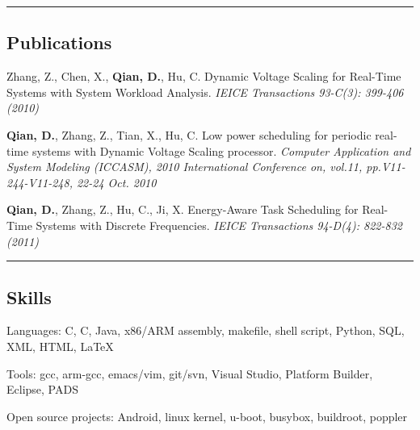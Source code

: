 \documentclass[10pt,letterpaper]{article}
\newenvironment{indentsection}[1]%
{\begin{list}{}%
	{\setlength{\leftmargin}{#1}}%
	\item[]%
}
{\end{list}}
\newcommand{\CPP}
{C\nolinebreak[4]\hspace{-.05em}\raisebox{.22ex}{\footnotesize\bf ++}}
\begin{document}
\hrule
\vspace{-0.4em}
\subsection*{Publications}

\begin{itemize*}
        \item
        Zhang, Z., Chen, X., \textbf{Qian, D.}, Hu, C. Dynamic Voltage Scaling for Real-Time Systems with System Workload Analysis. \emph{IEICE Transactions 93-C(3): 399-406 (2010)}
	\item
        \textbf{Qian, D.}, Zhang, Z., Tian, X., Hu, C. Low power scheduling for periodic real-time systems with Dynamic Voltage Scaling processor. \emph{Computer Application and System Modeling (ICCASM), 2010 International Conference on, vol.11, pp.V11-244-V11-248, 22-24 Oct. 2010}
	\item
	\textbf{Qian, D.}, Zhang, Z., Hu, C., Ji, X. Energy-Aware Task Scheduling for Real-Time Systems with Discrete Frequencies. \emph{IEICE Transactions 94-D(4): 822-832 (2011)}
\end{itemize*}

\hrule
\vspace{-0.4em}
\subsection*{Skills}

\begin{indentsection}{\parindent}
\begin{description*}
	\item[Languages:] C, \CPP, Java, x86/ARM assembly, makefile, shell script, Python, SQL, XML, HTML, \LaTeX
	\item[Tools:] gcc, arm-gcc, emacs/vim, git/svn, Visual Studio, Platform Builder, Eclipse, PADS
	\item[Open source projects:] Android, linux kernel, u-boot, busybox, buildroot, poppler
\end{description*}
\end{indentsection}
\end{document}
